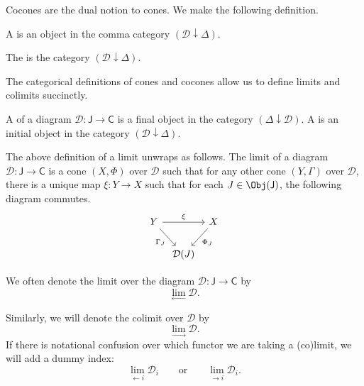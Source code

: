 \documentclass[main.tex]{subfiles}
\begin{document}
Cocones are the dual notion to cones. We make the following definition.
\begin{definition}[cocone]
  \label{def:cocone}
  A  is an object in the comma category $(\mathcal{D} \downarrow \Delta)$.
\end{definition}

\begin{definition}
  \label{def:categoryofcocones}
  The  is the category $(\mathcal{D} \downarrow \Delta)$.
\end{definition}

The categorical definitions of cones and cocones allow us to define limits and colimits succinctly.
\begin{definition}
  \label{def:limitscolimits}
  A  of a diagram $\mathcal{D}\colon \mathsf{J} \rightarrow \mathsf{C}$ is a final object in the category $(\Delta \downarrow \mathcal{D})$. A  is an initial object in the category $(\mathcal{D} \downarrow \Delta)$.
\end{definition}

\begin{note}
  The above definition of a limit unwraps as follows. The limit of a diagram $\mathcal{D}\colon \mathsf{J} \rightarrow \mathsf{C}$ is a cone $(X, \Phi)$ over $\mathcal{D}$ such that for any other cone $(Y, \Gamma)$ over $\mathcal{D}$, there is a unique map $\xi\colon Y \to X$ such that for each $J \in \Obj(\mathsf{J})$, the following diagram commutes.
  \begin{equation*}
    \begin{tikzcd}[column sep=tiny]
      Y
      \arrow[rr, "\xi"]
      \arrow[dr, swap, "\Gamma_{J}"]
      & & X
      \arrow[dl, "\Phi_{J}"]
      \\
      & \mathcal{D}(J)
    \end{tikzcd}
  \end{equation*}
\end{note}

\begin{notation}
  We often denote the limit over the diagram $\mathcal{D}\colon \mathsf{J} \rightarrow \mathsf{C}$ by
  \begin{equation*}
    \lim_{\leftarrow} \mathcal{D}.
  \end{equation*}

  Similarly, we will denote the colimit over $\mathcal{D}$ by
  \begin{equation*}
    \lim_{\rightarrow} \mathcal{D}.
  \end{equation*}
  If there is notational confusion over which functor we are taking a (co)limit, we will add a dummy index:
  \begin{equation*}
    \lim_{\leftarrow i} \mathcal{D}_{i}\qquad\text{or}\qquad\lim_{\rightarrow i} \mathcal{D}_{i}.
  \end{equation*}
\end{notation}
\end{document}
